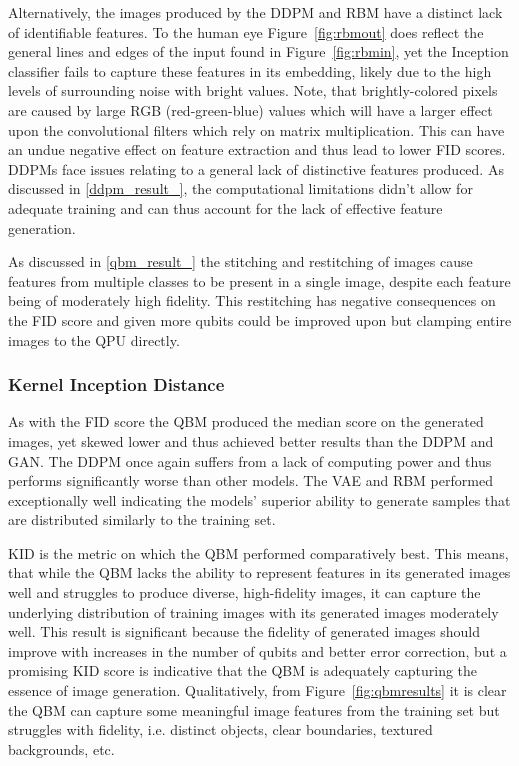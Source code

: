 \documentclass[%
 reprint,
 amsmath,amssymb,
 aps,
]{revtex4-2}
\begin{document}
Alternatively, the images produced by the DDPM and RBM have a distinct lack of identifiable features. To the human eye Figure~\ref{fig:rbmout} does reflect the general lines and edges of the input found in Figure~\ref{fig:rbmin}, yet the Inception classifier fails to capture these features in its embedding, likely due to the high levels of surrounding noise with bright values. Note, that brightly-colored pixels are caused by large RGB (red-green-blue) values which will have a larger effect upon the convolutional filters which rely on matrix multiplication. This can have an undue negative effect on feature extraction and thus lead to lower FID scores. DDPMs face issues relating to a general lack of distinctive features produced. As discussed in \ref{ddpm_result_}, the computational limitations didn't allow for adequate training and can thus account for the lack of effective feature generation.


As discussed in \ref{qbm_result_} the stitching and restitching of images cause features from multiple classes to be present in a single image, despite each feature being of moderately high fidelity.  This restitching has negative consequences on the FID score and given more qubits could be improved upon but clamping entire images to the QPU directly.


\subsubsection{Kernel Inception Distance}
As with the FID score the QBM produced the median score on the generated images, yet skewed lower and thus achieved better results than the DDPM and GAN. The DDPM once again suffers from a lack of computing power and thus performs significantly worse than other models. The VAE and RBM performed exceptionally well indicating the models' superior ability to generate samples that are distributed similarly to the training set.


KID is the metric on which the QBM performed comparatively best. This means, that while the QBM lacks the ability to represent features in its generated images well and struggles to produce diverse, high-fidelity images, it can capture the underlying distribution of training images with its generated images moderately well. This result is significant because the fidelity of generated images should improve with increases in the number of qubits and better error correction, but a promising KID score is indicative that the QBM is adequately capturing the essence of image generation. Qualitatively, from Figure~\ref{fig:qbmresults} it is clear the QBM can capture some meaningful image features from the training set but struggles with fidelity, i.e. distinct objects, clear boundaries, textured backgrounds, etc.
\end{document}
